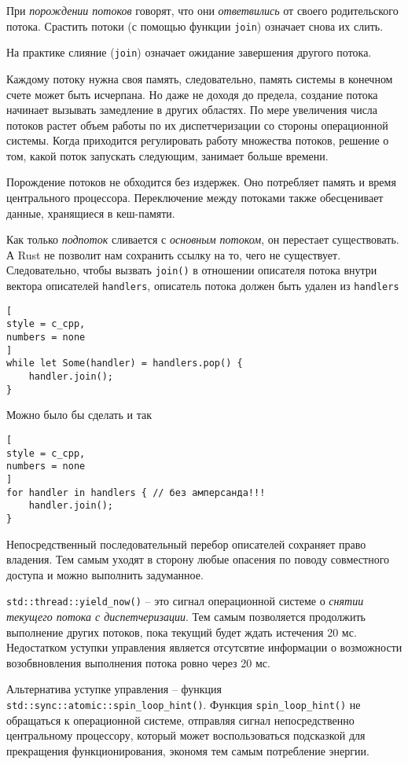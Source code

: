 \documentclass[%
	11pt,
	a4paper,
	utf8,
		]{article}
\begin{document}
При \emph{порождении потоков} говорят, что они \emph{ответвились} от своего родительского потока. Срастить потоки (с помощью функции \verb|join|) означает снова их слить. 

На практике слияние (\verb|join|) означает ожидание завершения другого потока.

{\color{red}
Каждому потоку нужна своя память, следовательно, память системы в конечном счете может быть исчерпана. Но даже не доходя до предела, создание потока начинает вызывать замедление в других областях. По мере увеличения числа потоков растет объем работы по их диспетчеризации со стороны операционной системы. Когда приходится регулировать работу множества потоков, решение о том, какой поток запускать следующим, занимает больше времени.
}

Порождение потоков не обходится без издержек. Оно потребляет память и время центрального процессора. Переключение между потоками также обесценивает данные, хранящиеся в кеш-памяти. 

Как только \emph{подпоток} сливается с \emph{основным потоком}, он перестает существовать. А Rust не позволит нам сохранить ссылку на то, чего не существует. Следовательно, чтобы вызвать \verb|join()| в отношении описателя потока внутри вектора описателей \verb|handlers|, описатель потока должен быть удален из \verb|handlers|
\begin{lstlisting}[
style = c_cpp,
numbers = none
]
while let Some(handler) = handlers.pop() {
    handler.join();
}
\end{lstlisting} 

Можно было бы сделать и так
\begin{lstlisting}[
style = c_cpp,
numbers = none
]
for handler in handlers { // без амперсанда!!!
    handler.join();
}
\end{lstlisting}

Непосредственный последовательный перебор описателей сохраняет право владения. Тем самым уходят в сторону любые опасения по поводу совместного доступа и можно выполнить задуманное.

\verb|std::thread::yield_now()| -- это сигнал операционной системе о \emph{снятии текущего потока с диспетчеризации}. Тем самым позволяется продолжить выполнение других потоков, пока текущий будет ждать истечения 20 мс. Недостатком уступки управления является отсутсвтие информации о возможности возобвновления выполнения потока ровно через 20 мс.

Альтернатива уступке управления -- функция \verb|std::sync::atomic::spin_loop_hint()|. Функция \verb|spin_loop_hint()| не обращаться к операционной системе, отправляя сигнал непосредственно центральному процессору, который может воспользоваться подсказкой для прекращения функционирования, экономя тем самым потребление энергии.
\end{document}

